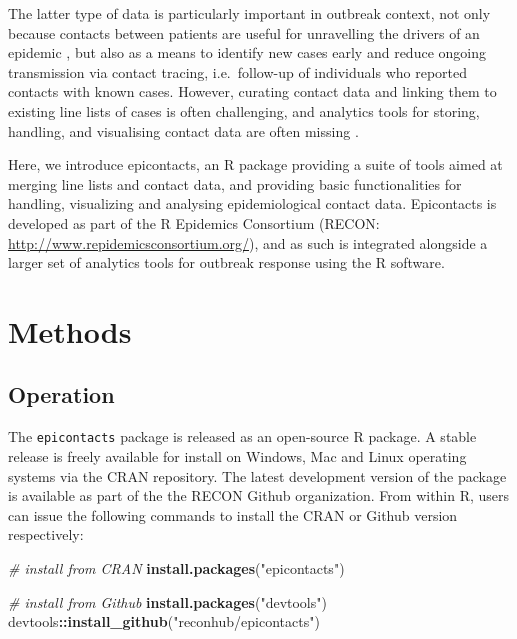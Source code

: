 \documentclass[9pt,a4paper,]{extarticle}
\newenvironment{Shaded}{\begin{snugshade}}{\end{snugshade}}
\newcommand{\KeywordTok}[1]{\textcolor[rgb]{0.13,0.29,0.53}{\textbf{#1}}}
\newcommand{\StringTok}[1]{\textcolor[rgb]{0.31,0.60,0.02}{#1}}
\newcommand{\CommentTok}[1]{\textcolor[rgb]{0.56,0.35,0.01}{\textit{#1}}}
\newcommand{\OperatorTok}[1]{\textcolor[rgb]{0.81,0.36,0.00}{\textbf{#1}}}
\newcommand{\NormalTok}[1]{#1}
\theoremstyle{definition}
\theoremstyle{definition}
\theoremstyle{definition}
\theoremstyle{remark}
\begin{document}
The latter type of data is particularly important in outbreak context, not only because contacts between patients are useful for unravelling the drivers of an epidemic \citep{agua-agum:2016}\citep{cauchemez:2016}, but also as a means to identify new cases early and reduce ongoing transmission via contact tracing, i.e.~follow-up of individuals who reported contacts with known cases\citep{senga:2017}\citep{saurabh:2017}. However, curating contact data and linking them to existing line lists of cases is often challenging, and analytics tools for storing, handling, and visualising contact data are often missing \citep{who:2009}\citep{rakesh:2014}.

Here, we introduce epicontacts, an R package providing a suite of tools aimed at merging line lists and contact data, and providing basic functionalities for handling, visualizing and analysing epidemiological contact data. Epicontacts is developed as part of the R Epidemics Consortium (RECON: \url{http://www.repidemicsconsortium.org/}), and as such is integrated alongside a larger set of analytics tools for outbreak response using the R software\citep{rcore}.

\section{Methods}\label{methods}

\subsection{Operation}\label{operation}

The \texttt{epicontacts} package is released as an open-source R package. A stable release is freely available for install on Windows, Mac and Linux operating systems via the CRAN repository. The latest development version of the package is available as part of the the RECON Github organization. From within R, users can issue the following commands to install the CRAN or Github version respectively:

\begin{Shaded}
\begin{Highlighting}[]
\CommentTok{# install from CRAN}
\KeywordTok{install.packages}\NormalTok{(}\StringTok{"epicontacts"}\NormalTok{)}

\CommentTok{# install from Github}
\KeywordTok{install.packages}\NormalTok{(}\StringTok{"devtools"}\NormalTok{)}
\NormalTok{devtools}\OperatorTok{::}\KeywordTok{install_github}\NormalTok{(}\StringTok{"reconhub/epicontacts"}\NormalTok{)}
\end{Highlighting}
\end{Shaded}
\end{document}
